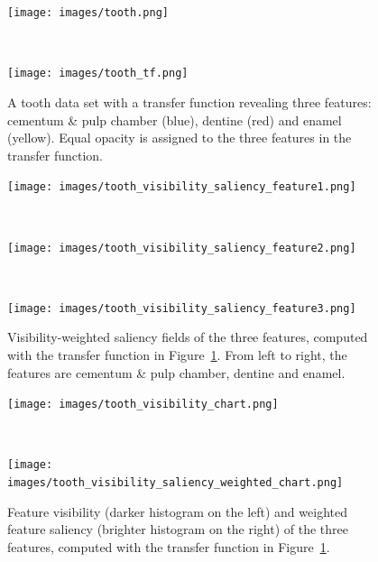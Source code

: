 \begin{figure}
	\centering
	\begin{minipage}{.2\textwidth}
		\texttt{[image: images/tooth.png]}
	\end{minipage}~
	\begin{minipage}{.1\textwidth}
		\texttt{[image: images/tooth\_tf.png]}
	\end{minipage}
	\caption{A tooth data set with a transfer function revealing three features: cementum \& pulp chamber (blue), dentine (red) and enamel (yellow). Equal opacity is assigned to the three features in the transfer function.}
	\label{fig:tooth}
\end{figure}

\begin{figure}
	\centering
	\begin{minipage}{.15\textwidth}
		\texttt{[image: images/tooth\_visibility\_saliency\_feature1.png]}
	\end{minipage}~
	\begin{minipage}{.15\textwidth}
		\texttt{[image: images/tooth\_visibility\_saliency\_feature2.png]}
	\end{minipage}~
	\begin{minipage}{.15\textwidth}
		\texttt{[image: images/tooth\_visibility\_saliency\_feature3.png]}
	\end{minipage}
	\caption{Visibility-weighted saliency fields of the three features, computed with the transfer function in Figure~\ref{fig:tooth}. From left to right, the features are cementum \& pulp chamber, dentine and enamel.}
	\label{fig:tooth_saliency_field}
\end{figure}

\begin{figure}
	\centering
	\begin{minipage}{.2\textwidth}
		\texttt{[image: images/tooth\_visibility\_chart.png]}
	\end{minipage}~
	\begin{minipage}{.2\textwidth}
		\texttt{[image: images/tooth\_visibility\_saliency\_weighted\_chart.png]}
	\end{minipage}
	\caption{Feature visibility (darker histogram on the left) and weighted feature saliency (brighter histogram on the right) of the three features, computed with the transfer function in Figure~\ref{fig:tooth}.}
	\label{fig:tooth_saliency_chart}
\end{figure}

